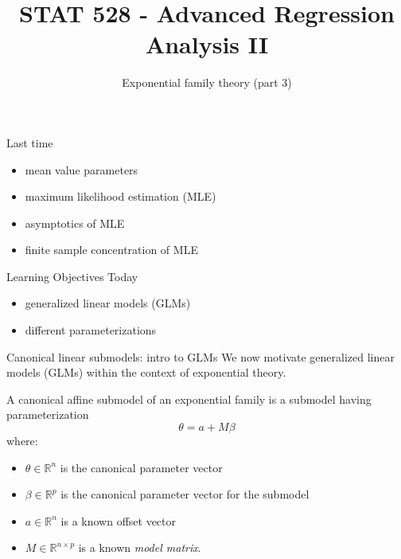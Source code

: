 \documentclass[
  ignorenonframetext,
]{beamer}
\title{STAT 528 - Advanced Regression Analysis II}
\author{Exponential family theory (part 3)}
\date{}
\institute{Daniel J. Eck\\
Department of Statistics\\
University of Illinois}
\providecommand{\tightlist}{%
  \setlength{\itemsep}{0pt}\setlength{\parskip}{0pt}}
\begin{document}
\frame{\titlepage}

\begin{frame}
\newcommand{\R}{\mathbb{R}}
\newcommand{\Prob}{\mathbb{P}}
\newcommand{\Proj}{\textbf{P}}
\newcommand{\Hcal}{\mathcal{H}}
\newcommand{\rootn}{\sqrt{n}}
\newcommand{\p}{\mathbf{p}}
\newcommand{\E}{\text{E}}
\newcommand{\Var}{\text{Var}}
\newcommand{\Cov}{\text{Cov}}

\newtheorem{cor}{Corollary}
\newtheorem{lem}{Lemma}
\newtheorem{thm}{Theorem}
\newtheorem{defn}{Definition}
\newtheorem{prop}{Proposition}
\end{frame}

\begin{frame}{Last time}
\protect\hypertarget{last-time}{}
\begin{itemize}
\tightlist
\item
  mean value parameters
\item
  maximum likelihood estimation (MLE)
\item
  asymptotics of MLE
\item
  finite sample concentration of MLE
\end{itemize}
\end{frame}

\begin{frame}{Learning Objectives Today}
\protect\hypertarget{learning-objectives-today}{}
\begin{itemize}
\tightlist
\item
  generalized linear models (GLMs)
\item
  different parameterizations
\end{itemize}
\end{frame}

\begin{frame}{Canonical linear submodels: intro to GLMs}
\protect\hypertarget{canonical-linear-submodels-intro-to-glms}{}
We now motivate generalized linear models (GLMs) within the context of
exponential theory.

A canonical affine submodel of an exponential family is a submodel
having parameterization \[
  \theta = a + M\beta
\] where:

\begin{itemize}
\tightlist
\item
  \(\theta \in \mathbb{R}^n\) is the canonical parameter vector
\item
  \(\beta \in \mathbb{R}^p\) is the canonical parameter vector for the
  submodel
\item
  \(a \in \mathbb{R}^n\) is a known offset vector
\item
  \(M \in \mathbb{R}^{n\times p}\) is a known \emph{model matrix}.
\end{itemize}
\end{frame}
\end{document}
